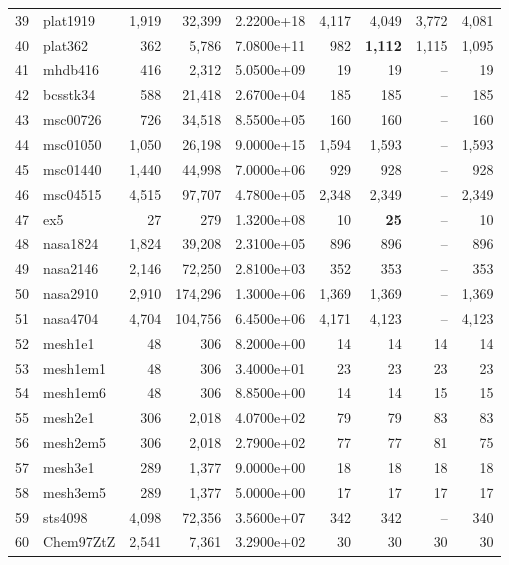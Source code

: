 \begin{table}
\begin{center}
\begin{tabular}{rlrrr||rrrr}
 39 &   plat1919 & 1,919 &    32,399 & 2.2200e+18 &4,117 & 4,049 & 3,772 & 
 4,081 \\
 40 &    plat362 &  362 &     5,786 & 7.0800e+11 & 982 & \textbf{1,112} & 1,115 
 & 1,095 \\
 41 &    mhdb416 &  416 &     2,312 & 5.0500e+09 &  19 &   19 &  -- &   19 \\
 42 &   bcsstk34 &  588 &    21,418 & 2.6700e+04 & 185 &  185 &  -- &  185 \\
 43 &   msc00726 &  726 &    34,518 & 8.5500e+05 & 160 &  160 &  -- &  160 \\
 44 &   msc01050 & 1,050 &    26,198 & 9.0000e+15 &1,594 & 1,593 &  -- & 1,593 
 \\
 45 &   msc01440 & 1,440 &    44,998 & 7.0000e+06 & 929 &  928 &  -- &  928 \\
 46 &   msc04515 & 4,515 &    97,707 & 4.7800e+05 &2,348 & 2,349 &  -- & 2,349 
 \\
 47 &        ex5 &   27 &      279 & 1.3200e+08 &  10 & \textbf{  25} &  -- &   
 10 \\
 48 &   nasa1824 & 1,824 &    39,208 & 2.3100e+05 & 896 &  896 &  -- &  896 \\
 49 &   nasa2146 & 2,146 &    72,250 & 2.8100e+03 & 352 &  353 &  -- &  353 \\
 50 &   nasa2910 & 2,910 &   174,296 & 1.3000e+06 &1,369 & 1,369 &  -- & 1,369 
 \\
 51 &   nasa4704 & 4,704 &   104,756 & 6.4500e+06 &4,171 & 4,123 &  -- & 4,123 
 \\
 52 &    mesh1e1 &   48 &      306 & 8.2000e+00 &  14 &   14 &   14 &   14 \\
 53 &   mesh1em1 &   48 &      306 & 3.4000e+01 &  23 &   23 &   23 &   23 \\
 54 &   mesh1em6 &   48 &      306 & 8.8500e+00 &  14 &   14 &   15 &   15 \\
 55 &    mesh2e1 &  306 &     2,018 & 4.0700e+02 &  79 &   79 &   83 &   83 \\
 56 &   mesh2em5 &  306 &     2,018 & 2.7900e+02 &  77 &   77 &   81 &   75 \\
 57 &    mesh3e1 &  289 &     1,377 & 9.0000e+00 &  18 &   18 &   18 &   18 \\
 58 &   mesh3em5 &  289 &     1,377 & 5.0000e+00 &  17 &   17 &   17 &   17 \\
 59 &    sts4098 & 4,098 &    72,356 & 3.5600e+07 & 342 &  342 &  -- &  340 \\
 60 &  Chem97ZtZ & 2,541 &     7,361 & 3.2900e+02 &  30 &   30 &   30 &   30 \\

\end{tabular}
\end{center}
\end{table}

